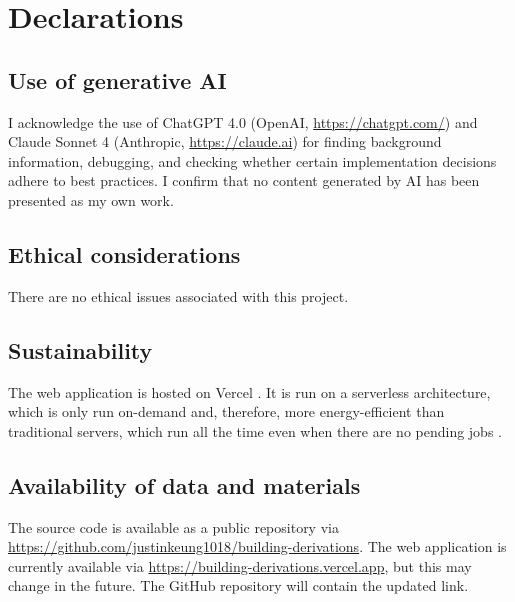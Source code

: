 \chapter*{Declarations}
\section*{Use of generative AI}
I acknowledge the use of ChatGPT 4.0 (OpenAI, \url{https://chatgpt.com/}) and Claude Sonnet 4 (Anthropic, \url{https://claude.ai}) for finding background information, debugging, and checking whether certain implementation decisions adhere to best practices. I confirm that no content generated by AI has been presented as my own work.

\section*{Ethical considerations}
There are no ethical issues associated with this project.

\section*{Sustainability}
The web application is hosted on Vercel \cite{vercel}. It is run on a serverless architecture, which is only run on-demand and, therefore, more energy-efficient than traditional servers, which run all the time even when there are no pending jobs \cite{vercel-green}.
\section*{Availability of data and materials}
The source code is available as a public repository via \url{https://github.com/justinkeung1018/building-derivations}. The web application is currently available via \url{https://building-derivations.vercel.app}, but this may change in the future. The GitHub repository will contain the updated link.